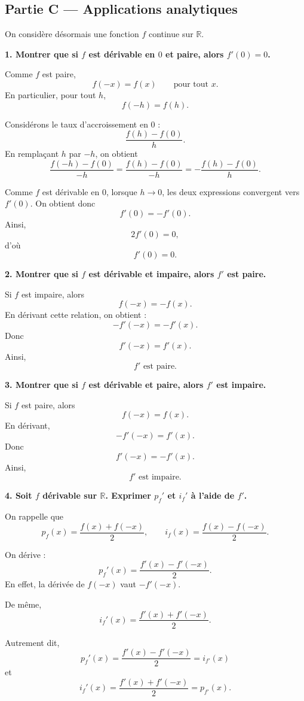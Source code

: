 \documentclass[11pt,a4paper]{article}
\newcommand{\R}{\mathbb{R}}
\begin{document}
\bigskip

\subsection*{Partie C --- Applications analytiques}

On considère désormais une fonction \(f\) continue sur \(\R\).

\textbf{1. Montrer que si \(f\) est dérivable en \(0\) et paire, alors \(f'(0)=0\).}

Comme \(f\) est paire,
\[
f(-x)=f(x)
\qquad \text{pour tout } x.
\]
En particulier, pour tout \(h\),
\[
f(-h)=f(h).
\]

Considérons le taux d'accroissement en \(0\) :
\[
\frac{f(h)-f(0)}{h}.
\]
En remplaçant \(h\) par \(-h\), on obtient
\[
\frac{f(-h)-f(0)}{-h}=\frac{f(h)-f(0)}{-h}=-\frac{f(h)-f(0)}{h}.
\]

Comme \(f\) est dérivable en \(0\), lorsque \(h\to 0\), les deux expressions convergent vers \(f'(0)\).
On obtient donc
\[
f'(0)=-f'(0).
\]
Ainsi,
\[
2f'(0)=0,
\]
d'où
\[
\boxed{f'(0)=0.}
\]

\bigskip

\textbf{2. Montrer que si \(f\) est dérivable et impaire, alors \(f'\) est paire.}

Si \(f\) est impaire, alors
\[
f(-x)=-f(x).
\]
En dérivant cette relation, on obtient :
\[
-f'(-x)=-f'(x).
\]
Donc
\[
f'(-x)=f'(x).
\]
Ainsi,
\[
\boxed{f' \text{ est paire.}}
\]

\bigskip

\textbf{3. Montrer que si \(f\) est dérivable et paire, alors \(f'\) est impaire.}

Si \(f\) est paire, alors
\[
f(-x)=f(x).
\]
En dérivant,
\[
-f'(-x)=f'(x).
\]
Donc
\[
f'(-x)=-f'(x).
\]
Ainsi,
\[
\boxed{f' \text{ est impaire.}}
\]

\bigskip

\textbf{4. Soit \(f\) dérivable sur \(\R\). Exprimer \(p_f'\) et \(i_f'\) à l'aide de \(f'\).}

On rappelle que
\[
p_f(x)=\frac{f(x)+f(-x)}{2},
\qquad
i_f(x)=\frac{f(x)-f(-x)}{2}.
\]

On dérive :
\[
p_f'(x)=\frac{f'(x)-f'(-x)}{2}.
\]
En effet, la dérivée de \(f(-x)\) vaut \(-f'(-x)\).

De même,
\[
i_f'(x)=\frac{f'(x)+f'(-x)}{2}.
\]

Autrement dit,
\[
\boxed{p_f'(x)=\frac{f'(x)-f'(-x)}{2}=i_{f'}(x)}
\]
et
\[
\boxed{i_f'(x)=\frac{f'(x)+f'(-x)}{2}=p_{f'}(x).}
\]
\end{document}
